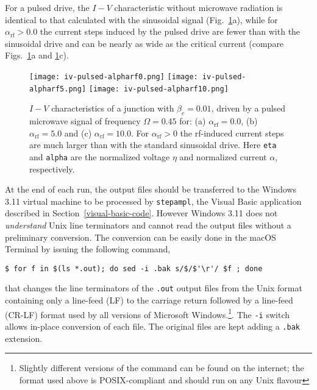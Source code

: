For a pulsed drive, the $I - V$ characteristic without microwave radiation is identical to that calculated with the sinusoidal signal (Fig.~\ref{fig:iv-pulsed}a), while for $\alpha_\mathrm{rf} > 0.0$ the current steps induced by the pulsed drive are fewer than with the sinusoidal drive and can be nearly as wide as the critical current (compare Figs.~\ref{fig:iv-pulsed}a and \ref{fig:iv-pulsed}c).

\begin{figure}[tb]
{
	\fboxsep=0pt
	\mbox{\texttt{[image: iv-pulsed-alpharf0.png]}}
	\hfill
	\mbox{\texttt{[image: iv-pulsed-alpharf5.png]}}
	\hfill
	\mbox{\texttt{[image: iv-pulsed-alpharf10.png]}}
}
	\caption{$I - V$ characteristics of a junction with $\beta_c = 0.01$, driven by a pulsed microwave signal of frequency $\Omega = 0.45$ for: (a) $\alpha_\mathrm{rf} = 0.0$, (b) $\alpha_\mathrm{rf} = 5.0$ and (c) $\alpha_\mathrm{rf} = 10.0$. For $\alpha_\mathrm{rf} > 0$ the rf-induced current steps are much larger than with the standard sinusoidal drive. Here \texttt{eta} and \texttt{alpha} are the normalized voltage $\eta$ and normalized current $\alpha$, respectively.}
	\label{fig:iv-pulsed}
\end{figure}


At the end of each run, the output files should be transferred to the Windows 3.11 virtual machine to be processed by \texttt{stepampl}, the Visual Basic application described in Section~\ref{visual-basic-code}. However Windows 3.11 does not \emph{understand} Unix line terminators and cannot read the output files without a preliminary conversion. 
The conversion can be easily done in the macOS Terminal by issuing the following command,

\begin{verbatim}
$ for f in $(ls *.out); do sed -i .bak s/$/$'\r'/ $f ; done
\end{verbatim}

that changes the line terminators of the \texttt{.out} output files from the Unix format containing only a line-feed (LF) to the carriage return followed by a line-feed (CR-LF) format used by all versions of Microsoft Windows.\footnote{Slightly different versions of the command can be found on the internet; the format used above is POSIX-compliant and should run on any Unix flavour}.
The \texttt{-i} switch allows in-place conversion of each file. The original files are kept adding a \texttt{.bak} extension.

